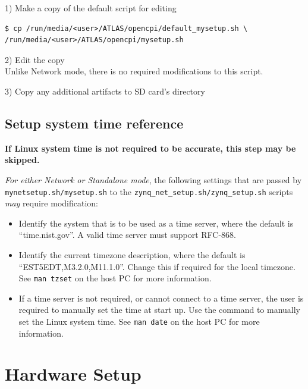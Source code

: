 \begin{flushleft}
1) Make a copy of the default script for editing\medskip
\begin{verbatim}
$ cp /run/media/<user>/ATLAS/opencpi/default_mysetup.sh \
/run/media/<user>/ATLAS/opencpi/mysetup.sh
\end{verbatim}\medskip

2) Edit the copy\\ \medskip
Unlike Network mode, there is no required modifications to this script. \medskip

3) Copy any additional artifacts to SD card's  directory \medskip

\subsection{Setup system time reference}
\textbf{If Linux system time is not required to be accurate, this step may be skipped.} \\ \medskip

\textit{For either Network or Standalone mode}, the following settings that are passed by \texttt{mynetsetup.sh/mysetup.sh} to the \texttt{zynq\_net\_setup.sh/zynq\_setup.sh} scripts \textit{may} require modification:

\begin{itemize}
 \item Identify the system that is to be used as a time server, where the default is ``time.nist.gov''. A valid time server must support RFC-868.
 \item Identify the current timezone description, where the default is ``EST5EDT,M3.2.0,M11.1.0''. Change this if required for the local timezone. See \texttt{man tzset} on the host PC for more information.
 \item If a time server is not required, or cannot connect to a time server, the user is required to manually set the time at start up.  Use the \code{date} command to manually set the Linux system time. See \texttt{man date} on the host PC for more information.
\end{itemize}
\end{flushleft}

\pagebreak
\section{Hardware Setup}

